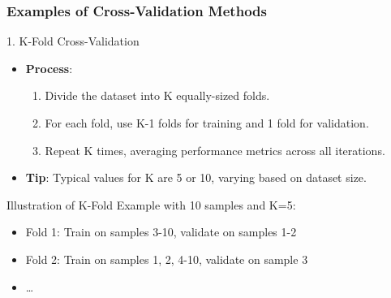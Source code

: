 \documentclass[aspectratio=169]{beamer}
\begin{document}
\begin{frame}
    \frametitle{Examples of Cross-Validation Methods}
    \begin{block}{1. K-Fold Cross-Validation}
        \begin{itemize}
            \item \textbf{Process}:
            \begin{enumerate}
                \item Divide the dataset into K equally-sized folds.
                \item For each fold, use K-1 folds for training and 1 fold for validation.
                \item Repeat K times, averaging performance metrics across all iterations.
            \end{enumerate}
            \item \textbf{Tip}: Typical values for K are 5 or 10, varying based on dataset size.
        \end{itemize}
        
        \begin{block}{Illustration of K-Fold}
            Example with 10 samples and K=5:
            \begin{itemize}
                \item Fold 1: Train on samples 3-10, validate on samples 1-2
                \item Fold 2: Train on samples 1, 2, 4-10, validate on sample 3
                \item \ldots
            \end{itemize}
        \end{block}
    \end{block}
\end{frame}
\end{document}

